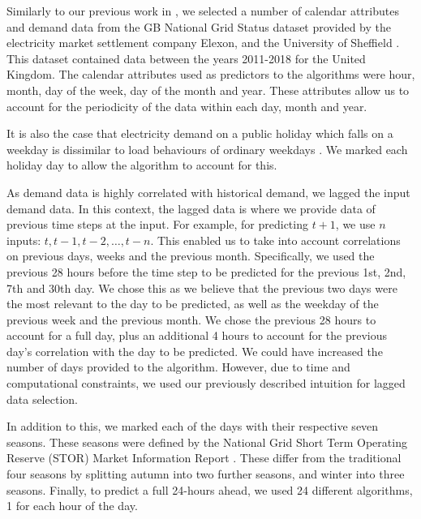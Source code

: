 \documentclass[final,3p,times,twocolumn,numbers]{elsarticle}
\begin{document}
 Similarly to our previous work in \cite{Kell2018a}, we selected a number of calendar attributes and demand data from the GB National Grid Status dataset provided by the electricity market settlement company Elexon, and the University of Sheffield \cite{gbnationalgridstatus_2019}. This dataset contained data between the years 2011-2018 for the United Kingdom. The calendar attributes used as predictors to the algorithms were hour, month, day of the week, day of the month and year. These attributes allow us to account for the periodicity of the data within each day, month and year.

It is also the case that electricity demand on a public holiday which falls on a weekday is dissimilar to load behaviours of ordinary weekdays \cite{Kim2000}. We marked each holiday day to allow the algorithm to account for this.

As demand data is highly correlated with historical demand, we lagged the input demand data. In this context, the lagged data is where we provide data of previous time steps at the input. For example, for predicting $t+1$, we use $n$ inputs: $t,t-1,t-2,\ldots,t-n$. This enabled us to take into account correlations on previous days, weeks and the previous month. Specifically, we used the previous 28 hours before the time step to be predicted for the previous 1st, 2nd, 7th and 30th day. We chose this as we believe that the previous two days were the most relevant to the day to be predicted, as well as the weekday of the previous week and the previous month. We chose the previous 28 hours to account for a full day, plus an additional 4 hours to account for the previous day's correlation with the day to be predicted. We could have increased the number of days provided to the algorithm. However, due to time and computational constraints, we used our previously described intuition for lagged data selection. %

In addition to this, we marked each of the days with their respective seven seasons. These seasons were defined by the National Grid Short Term Operating Reserve (STOR) Market Information Report \cite{ESO2019}. These differ from the traditional four seasons by splitting autumn into two further seasons, and winter into three seasons. Finally, to predict a full 24-hours ahead, we used 24 different algorithms, 1 for each hour of the day. 
\end{document}
